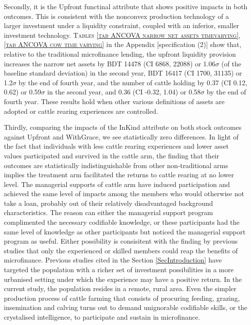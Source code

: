 	Secondly, it is the \textsf{Upfront} functinal attribute that shows positive impacts in both outcomes. %
	This is consistent with the nonconvex production technology of a larger investment under a liquidity constraint, coupled with an inferior, smaller investment technology. \textsc{\normalsize Tables \ref{tab ANCOVA narrow net assets timevarying}, \ref{tab ANCOVA cow time varying}} in the Appendix [specification (2)] show that, relative to the traditional microfinance lending, the upfront liquidity provision increases the narrow net assets by BDT 
	14478 
	(CI 6868, 22088) or 1.06$\sigma$ (of the baseline standard deviation) in the second year, 
	BDT 16417 
	(CI 1700, 31135) or 1.2$\sigma$ by the end of fourth year, 
	and the number of cattle holding by 0.37 
	(CI 0.12, 0.62) or 0.59$\sigma$ in the second year, and 
	0.36 
	(CI -0.32, 1.04) or 0.58$\sigma$ by the end of fourth year. These results hold when other various definitions of assets are adopted or cattle rearing experiences are controlled.

	Thirdly, comparing the impacts of the \textsf{InKind} attribute on both stock outcomes against \textsf{Upfront} and \textsf{WithGrace}, we see statistically zero differences. In light of the fact that individuals with less cattle rearing experiences and lower asset values participated and survived in the \textsf{cattle} arm, the finding that their outcomes are statistically indistinguishable from other non-\textsf{traditional} arms implies the treatment arm facilitated the returns to cattle rearing at no lower level. The managerial supports of \textsf{cattle} arm have induced participation and achieved the same level of impacts among the members who would otherwise not take a loan, probably out of their relatively disadvantaged background characteristics. The reason can either the managerial support program complimented the necessary codifiable knowledge, or these participants had the same level of knowledge as other participants but noticed the managerial support program as useful. Either possibility is consisitent with the finding by previous studies that only the experienced or skilled members could reap the benefits of microfinance. Previous studies cited in the Section \ref{SecIntroduction} have targeted the population with a richer set of investment possibilities in a more urbanised setting under which the experience may have a positive return. In the current study, the population resides in a remote, rural area. Even the simpler production process of cattle farming that consists of procuring feeding, grazing, insemination and calving turns out to demand unignorable codifiable skills, or the crystalised intelligence, to participate and sustain in microfinance.
	
